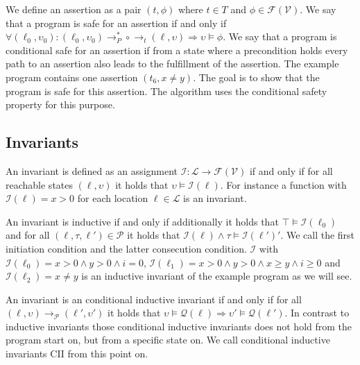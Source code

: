 We define an assertion as a pair $(t, \phi)$ where $t \in T$ and $\phi \in \mathcal{F}(\mathcal{V})$.
We say that a program is safe for an assertion if and only if $\forall (\ell_0, \upsilon_0): (\ell_0, \upsilon_0) \rightarrow_P^* \circ \rightarrow_t (\ell, \upsilon) \Rightarrow \upsilon \models \phi$.
We say that a program is conditional safe for an assertion if from a state where a precondition holds every path to an assertion also leads to the fulfillment of the assertion.
The example program contains one assertion $(t_6, x \neq y)$. The goal is to show that the program is safe for this assertion. The algorithm uses the conditional safety property for this purpose.

\subsection{Invariants}

An invariant is defined as an assignment $\mathcal{I} : \mathcal{L} \rightarrow \mathcal{F}(\mathcal{V})$ if and only if for all reachable states $(\ell, \upsilon)$ it holds that $\upsilon \models \mathcal{I}(\ell)$.
For instance a function with $\mathcal{I}(\ell) = x > 0$ for each location $\ell \in \mathcal{L}$ is an invariant.

An invariant is inductive if and only if additionally it holds that $\top \models \mathcal{I}(\ell_0)$ and for all $(\ell, \tau, \ell') \in \mathcal{P}$ it holds that $\mathcal{I}(\ell) \wedge \tau \models \mathcal{I}(\ell')'$. We call the first initiation condition and the latter consecution condition.
$\mathcal{I}$ with $\mathcal{I}(\ell_0) = x > 0 \wedge y > 0 \wedge i = 0$, $\mathcal{I}(\ell_1) = x > 0 \wedge y > 0 \wedge x \geq y \wedge i \geq 0$ and $\mathcal{I}(\ell_2) = x \neq y$  is an inductive invariant of the example program as we will see.

An invariant is an conditional inductive invariant if and only if for all $(\ell, \upsilon) \rightarrow_\mathcal{P} (\ell', \upsilon')$ it holds that $\upsilon \models \mathcal{Q}(\ell) \Rightarrow \upsilon' \models \mathcal{Q}(\ell')$.
In contrast to inductive invariants those conditional inductive invariants does not hold from the program start on, but from a specific state on.
We call conditional inductive invariants CII from this point on.


